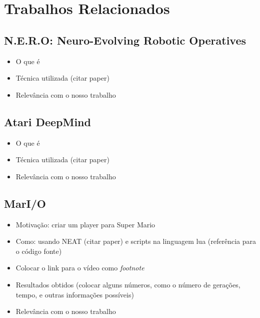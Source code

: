 \chapter{\label{chap:related-work}Trabalhos Relacionados}



\section{N.E.R.O: Neuro-Evolving Robotic Operatives}

\begin{mdframed}[backgroundcolor=green!20]
\begin{itemize}
    \item
        O que é
    \item
        Técnica utilizada (citar paper)
    \item
        Relevância com o nosso trabalho
\end{itemize}
\end{mdframed}

\section{Atari DeepMind}

\begin{mdframed}[backgroundcolor=green!20]
\begin{itemize}
    \item
        O que é
    \item
        Técnica utilizada (citar paper)
    \item
        Relevância com o nosso trabalho
\end{itemize}
\end{mdframed}

\section{MarI/O}

\begin{mdframed}[backgroundcolor=green!20]
\begin{itemize}
    \item
        Motivação: criar um player para Super Mario
    \item
        Como: usando NEAT (citar paper) e scripts na linguagem lua (referência
        para o código fonte)
    \item 
        Colocar o link para o vídeo como \textit{footnote}
    \item
        Resultados obtidos (colocar alguns números, como o número de gerações,
        tempo, e outras informações possíveis)
    \item
        Relevância com o nosso trabalho
\end{itemize}
\end{mdframed}
